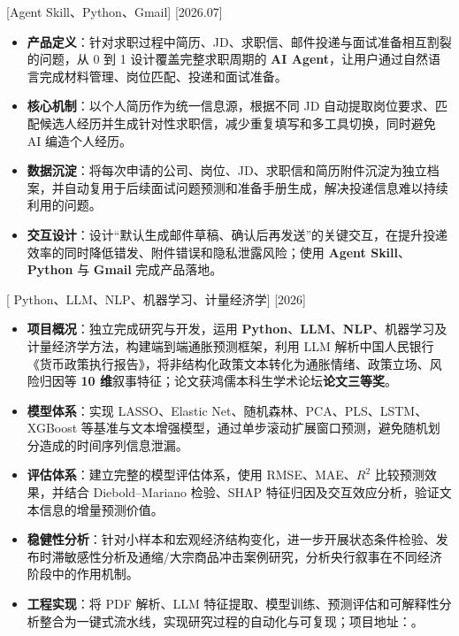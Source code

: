 \documentclass{resume}
\begin{document}
[Agent Skill、Python、Gmail]
[2026.07]
\begin{itemize}
  \item \textbf{产品定义}：针对求职过程中简历、JD、求职信、邮件投递与面试准备相互割裂的问题，从 0 到 1 设计覆盖完整求职周期的 \textbf{AI Agent}，让用户通过自然语言完成材料管理、岗位匹配、投递和面试准备。
  \item \textbf{核心机制}：以个人简历作为统一信息源，根据不同 JD 自动提取岗位要求、匹配候选人经历并生成针对性求职信，减少重复填写和多工具切换，同时避免 AI 编造个人经历。
  \item \textbf{数据沉淀}：将每次申请的公司、岗位、JD、求职信和简历附件沉淀为独立档案，并自动复用于后续面试问题预测和准备手册生成，解决投递信息难以持续利用的问题。
  \item \textbf{交互设计}：设计“默认生成邮件草稿、确认后再发送”的关键交互，在提升投递效率的同时降低错发、附件错误和隐私泄露风险；使用 \textbf{Agent Skill}、\textbf{Python} 与 \textbf{Gmail} 完成产品落地。
\end{itemize}

[{ Python、LLM、NLP、机器学习、计量经济学}]
[2026]
\begin{itemize}
  \item \textbf{项目概况}：独立完成研究与开发，运用 \textbf{Python}、\textbf{LLM}、\textbf{NLP}、机器学习及计量经济学方法，构建端到端通胀预测框架，利用 LLM 解析中国人民银行《货币政策执行报告》，将非结构化政策文本转化为通胀情绪、政策立场、风险归因等 \textbf{10 维}叙事特征；论文获鸿儒本科生学术论坛\textbf{论文三等奖}。
  \item \textbf{模型体系}：实现 LASSO、Elastic Net、随机森林、PCA、PLS、LSTM、XGBoost 等基准与文本增强模型，通过单步滚动扩展窗口预测，避免随机划分造成的时间序列信息泄漏。
  \item \textbf{评估体系}：建立完整的模型评估体系，使用 RMSE、MAE、$R^2$ 比较预测效果，并结合 Diebold–Mariano 检验、SHAP 特征归因及交互效应分析，验证文本信息的增量预测价值。
  \item \textbf{稳健性分析}：针对小样本和宏观经济结构变化，进一步开展状态条件检验、发布时滞敏感性分析及通缩/大宗商品冲击案例研究，分析央行叙事在不同经济阶段中的作用机制。
  \item \textbf{工程实现}：将 PDF 解析、LLM 特征提取、模型训练、预测评估和可解释性分析整合为一键式流水线，实现研究过程的自动化与可复现；项目地址：。
\end{itemize}
\end{document}
